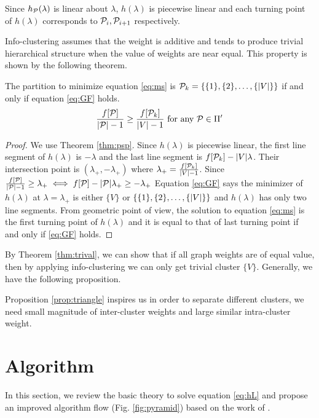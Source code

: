 \documentclass{article}
\begin{document}
Since $h_{\P}(\lambda)$ is linear about $\lambda$, $h(\lambda)$ is piecewise linear and each turning point of $h(\lambda)$ corresponds to $\P_i, \P_{i+1}$ respectively. 

Info-clustering assumes that the weight is additive and tends to produce trivial hierarchical structure when the value of weights are near equal. This property is shown by the following theorem.
\begin{theorem}\label{thm:trival}
The partition to minimize equation \eqref{eq:ms} is $\P_k = \{\{1\},\{2\},\dots,\{\abs{V}\}\}$ if and only if equation \eqref{eq:GF} holds.
\begin{equation}\label{eq:GF}
\frac{f[\P]}{\abs{\P}-1} \geq \frac{f[\P_k]}{\abs{V}-1} \textrm{ for any } \P \in \Pi'
\end{equation}
\end{theorem}
\begin{proof}
We use Theorem \ref{thm:psp}. Since $h(\lambda)$ is piecewise linear, the first line segment of $h(\lambda)$ is $ - \lambda $ and the last line segment is $ f[\P_k] - \abs{V} \lambda$. Their intersection point is $(\lambda_{+}, -\lambda_{+})$ where $\lambda_{+} = \frac{f[\P_k]}{\abs{V}-1}$. Since $\frac{f[\P]}{\abs{\P}-1} \geq \lambda_{+} \iff f[\P] - \abs{\P}\lambda_{+} \geq - \lambda_{+}$ Equation \eqref{eq:GF} says the minimizer of $h(\lambda)$ at $\lambda = \lambda_{+}$ is either $\{V\}$ or $\{\{1\},\{2\},\dots,\{\abs{V}\}\}$ and $h(\lambda)$ has only two line segments. From geometric point of view, the solution to equation \eqref{eq:ms} is the first turning point of $h(\lambda)$ and it is equal to that of last turning point if and only if \eqref{eq:GF} holds.
\end{proof}
By Theorem \ref{thm:trival}, we can show that if all graph weights are of equal value, then by applying info-clustering we can only get trivial cluster $\{V\}$. Generally, we have the following proposition.


Proposition \ref{prop:triangle} inspires us in order to separate different clusters, we need small magnitude of inter-cluster weights and large similar intra-cluster weight.

\section{Algorithm}\label{sec:algorithm}

In this section, we review the basic theory to solve equation \eqref{eq:hL} and propose an improved algorithm flow (Fig. \ref{fig:pyramid}) based on the work of \cite{RN4}. 
\end{document}
